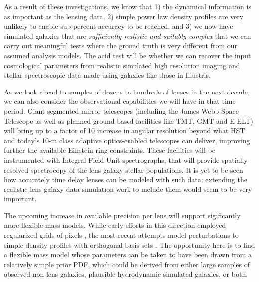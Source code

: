As a result of these investigations, we know that 1) the dynamical
information is as important as the lensing data, 2) simple power law
density profiles are very unlikely to enable sub-percent accuracy to be
reached, and 3) we now have simulated galaxies that are {\it
sufficiently realistic and suitably complex} that we can carry out
meaningful tests where the ground truth is  very different from our
assumed analysis models. The acid test will be whether we can recover
the input cosmological parameters  from realistic simulated high
resolution imaging and stellar spectroscopic data made using galaxies
like those in Illustris.

As we look ahead to samples of dozens to hundreds of lenses in the next
decade,  we can also consider the observational capabilities we will
have in that time period. Giant segmented mirror telescopes (including
the James Webb Space Telescope as well as planned ground-based
facilities like TMT, GMT and E-ELT) will bring up to a factor of 10
increase in angular resolution beyond what HST and today's 10-m class
adaptive optics-enabled telescopes can deliver, improving  further the
available Einstein ring constraints. These facilities will  be
instrumented with Integral Field Unit spectrographs, that will  provide
spatially-resolved spectrocopy of the lens galaxy stellar populations.
It is yet to be seen how accurately time delay lenses can be modeled with
such data: extending the realistic lens galaxy data simulation work to include
them would seem to be very important.

The upcoming increase in available precision per lens will support
sigificantly more flexible mass models. While early efforts in this direction
employed regularized grids of pixels \citep{Koo05,SuyuEtal2009,V+K09a},
the most recent attempts model perturbations to simple density profiles with
orthogonal basis sets \citep{BirrerEtal2015}. The opportunity here is to find a
flexible mass model whose parameters can be taken to have been drawn from
a relatively simple prior PDF, which could be derived from either large samples
of observed non-lens galaxies, plausible hydrodynamic simulated galaxies, or both.


